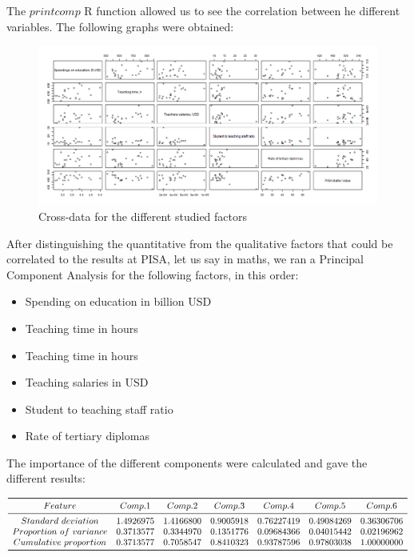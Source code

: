 \documentclass[12pt,a4paper]{article}
\begin{document}
The $printcomp$ R function allowed us to see the correlation between he different variables. The following graphs were obtained:
\begin{figure}
	\centering
	\label{printComp}
	\caption{Cross-data for the different studied factors}
	\includegraphics[scale=0.4]{img/correlations.png}
\end{figure}

After distinguishing the quantitative from the qualitative factors that could be correlated to the results at PISA, let us say in maths, we ran a Principal Component Analysis for the following factors, in this order:
\begin{itemize}
	\item Spending on education in billion USD
	\item Teaching time in hours
	\item Teaching time in hours
	\item Teaching salaries in USD
	\item Student to teaching staff ratio
	\item Rate of tertiary diplomas
\end{itemize}

The importance of the different components were calculated and gave the different results:
	
	\begin{table}[h]
		\centering
		$\begin{array} {*{7}{c}}
			\toprule
			Feature & Comp.1 & Comp.2 & Comp.3 & Comp.4 & Comp.5 & Comp.6 \\
			\midrule
			Standard~deviation& 1.4926975 & 1.4166800 & 0.9005918 &  0.76227419 & 0.49084269 & 0.36306706\\
			Proportion~of~variance & 0.3713577 & 0.3344970 & 0.1351776 &  0.09684366 & 0.04015442 & 0.02196962\\
			Cumulative~proportion & 0.3713577 & 0.7058547 & 0.8410323 &  0.93787596 & 0.97803038 & 1.00000000\\
			\bottomrule
		\end{array}$
	\end{table}
	
\end{document}
